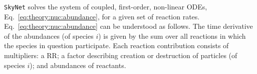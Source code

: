 \texttt{SkyNet} solves the system of coupled, first-order, non-linear \acp{ODE}, 
Eq.~\eqref{eq:theory:nuc:abundance}, for a given set of reaction rates.  %
Eq.~\eqref{eq:theory:nuc:abundance} can be understood as follows. 
The time derivative of the abundances (of species $i$) is given by the sum over all reactions 
in which the species in question participate. Each reaction contribution consists of multipliers: 
a \ac{RR}; a factor describing creation or destruction of particles (of species $i$); 
and abundances of reactants. 
%
%
%
%
